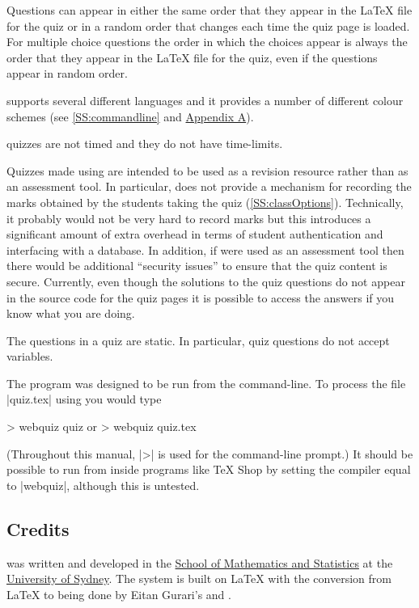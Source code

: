 \documentclass[svgnames]{article}
\begin{document}
      Questions can appear in either the same order that they appear in
      the \LaTeX{} file for the quiz or in a random order that changes
      each time the quiz page is loaded. For multiple choice questions the
      order in which the choices appear is always the order that they
      appear in the \LaTeX{} file for the quiz, even if the questions
      appear in random order.

      \WebQuiz supports several different languages and it
      provides a number of different colour schemes (see
      \autoref{SS:commandline} and \hyperref[SS:themes]{Appendix A}).

      \WebQuiz quizzes are not timed and they do not have time-limits.

      Quizzes made using \WebQuiz are intended to be used as a
      revision resource rather than as an assessment tool. In particular,
      \WebQuiz does not provide a mechanism for recording the marks
      obtained by the students taking the quiz
      (\autoref{SS:classOptions}). Technically, it probably would not be
      very hard to record marks but this introduces a significant amount
      of extra overhead in terms of student authentication and interfacing
      with a database. In addition, if \WebQuiz were used as an assessment
      tool then there would be additional ``security issues'' to ensure
      that the quiz content is secure. Currently, even though the
      solutions to the quiz questions do not appear in the \HTML source
      code for the quiz pages it is possible to access the answers if you
      know what you are doing.

      The questions in a \WebQuiz quiz are static. In particular,
      \WebQuiz quiz questions do not accept variables.

      The \WebQuiz program was designed to be run from the command-line.
      To process the file \BashCode|quiz.tex| using \WebQuiz you would
      type
      \begin{bashcode}
        > webquiz quiz         or         > webquiz quiz.tex
      \end{bashcode}
      (Throughout this manual, \BashCode|>| is used for the command-line
      prompt.)
      It should be possible to run \WebQuiz from inside programs like \TeX
      Shop by setting the compiler equal to \BashCode|webquiz|, although
      this is untested.

  \subsection{Credits}
      \WebQuiz{} was written and developed in the
      \href{http://www.maths.usyd.edu.au/}{School of Mathematics and
      Statistics} at the \href{http://www.usyd.edu.au/}{University of
      Sydney}.  The system is built on \LaTeX{} with the conversion from
      \LaTeX{} to \HTML being done by Eitan Gurari's
      \TeXfht and .
\end{document}
